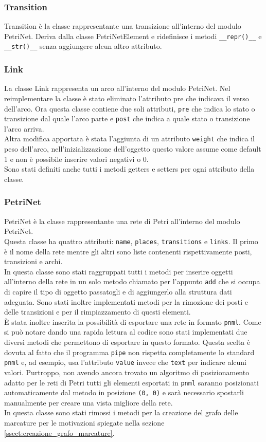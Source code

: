 \documentclass[italian,12pt]{book}
\begin{document}
\subsubsection{Transition}
Transition è la classe rappresentante una transizione all'interno del modulo PetriNet. Deriva dalla classe PetriNetElement e ridefinisce i metodi {\tt \_\_repr()\_\_} e {\tt \_\_str()\_\_} senza aggiungere alcun altro attributo.

\subsubsection{Link}
La classe Link rappresenta un arco all'interno del modulo PetriNet. Nel reimplementare la classe è stato eliminato l'attributo pre che indicava il verso dell'arco. Ora questa classe contiene due soli attributi, {\tt pre} che indica lo stato o transizione dal quale l'arco parte e {\tt post} che indica a quale stato o transizione l'arco arriva.\\
Altra modifica apportata è stata l'aggiunta di un attributo {\tt weight} che indica il peso dell'arco, nell'inizializzazione dell'oggetto questo valore assume come default 1 e non è possibile inserire valori negativi o 0.\\
Sono stati definiti anche tutti i metodi getters e setters per ogni attributo della classe.

\subsubsection{PetriNet}
PetriNet è la classe rappresentante una rete di Petri all'interno del modulo PetriNet.\\
Questa classe ha quattro attributi: {\tt name}, {\tt places}, {\tt transitions} e {\tt links}. Il primo è il nome della rete mentre gli altri sono liste contenenti rispettivamente posti, transizioni e archi.\\
In questa classe sono stati raggruppati tutti i metodi per inserire oggetti all'interno della rete in un solo metodo chiamato per l'appunto {\tt add} che si occupa di capire il tipo di oggetto passatogli e di aggiungerlo alla struttura dati adeguata. Sono stati inoltre implementati metodi per la rimozione dei posti e delle transizioni e per il rimpiazzamento di questi elementi.\\
È stata inoltre inserita la possibilità di esportare una rete in formato {\tt pnml}. Come si può notare dando una rapida lettura al codice sono stati implementati due diversi metodi che permettono di esportare in questo formato. Questa scelta è dovuta al fatto che il programma {\tt pipe} non rispetta completamente lo standard {\tt pnml} e, ad esempio, usa l'attributo {\tt value} invece che {\tt text} per indicare alcuni valori. Purtroppo, non avendo ancora trovato un algoritmo di posizionamento adatto per le reti di Petri tutti gli elementi esportati in {\tt pnml} saranno posizionati automaticamente dal metodo in posizione {\tt (0, 0)} e sarà necessario spostarli manualmente per creare una vista migliore della rete. \\
In questa classe sono stati rimossi i metodi per la creazione del grafo delle marcature per le motivazioni spiegate nella sezione \ref{ssect:creazione_grafo_marcature}.
\end{document}

